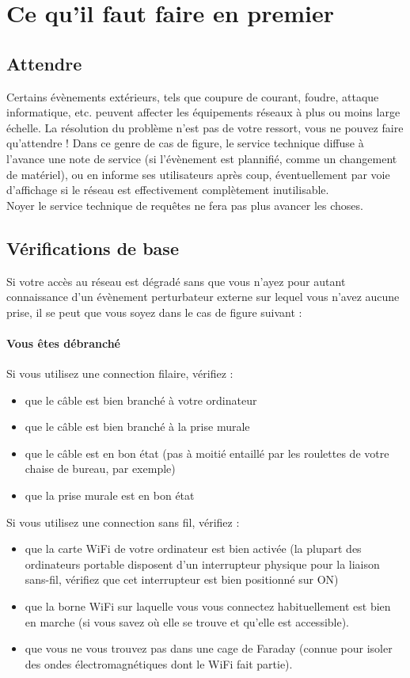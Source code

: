 \section{Ce qu'il faut faire en premier}

\subsection{Attendre}
Certains évènements extérieurs, tels que coupure de courant, foudre,
attaque informatique, etc. peuvent affecter les équipements réseaux à plus
ou moins large échelle. La résolution du problème n'est pas de votre
ressort, vous ne pouvez faire qu'attendre ! Dans ce genre de cas de
figure, le service technique diffuse à l'avance une note de service (si
l'évènement est plannifié, comme un changement de matériel), ou en informe
ses utilisateurs après coup, éventuellement par voie d'affichage si le
réseau est effectivement complètement inutilisable.\\
Noyer le service technique de requêtes ne fera pas plus avancer les choses.

\subsection{Vérifications de base}
Si votre accès au réseau est dégradé sans que vous n'ayez pour autant
connaissance d'un évènement perturbateur externe sur lequel vous n'avez
aucune prise, il se peut que vous soyez dans le cas de figure suivant :

\paragraph{Vous êtes débranché}
Si vous utilisez une connection filaire, vérifiez :

\begin{itemize}
\item que le câble est bien branché à votre ordinateur
\item que le câble est bien branché à la prise murale
\item que le câble est en bon état (pas à moitié entaillé par les roulettes
de votre chaise de bureau, par exemple)
\item que la prise murale est en bon état
\end{itemize}

\vskip 5pt

Si vous utilisez une connection sans fil, vérifiez :

\begin{itemize}
\item que la carte WiFi de votre ordinateur est bien activée (la plupart
des ordinateurs portable disposent d'un interrupteur physique pour la
liaison sans-fil, vérifiez que cet interrupteur est bien positionné sur ON)
\item que la borne WiFi sur laquelle vous vous connectez habituellement est
bien en marche (si vous savez où elle se trouve et qu'elle est accessible). 
\item que vous ne vous trouvez pas dans une cage de Faraday (connue pour
isoler des ondes électromagnétiques dont le WiFi fait partie).
\end{itemize}
